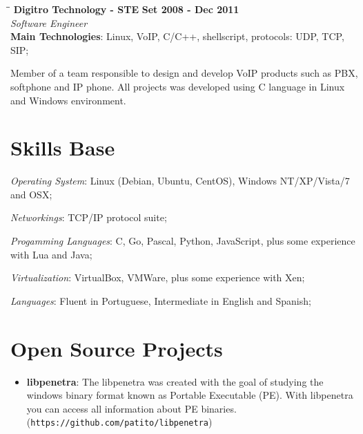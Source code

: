 \documentclass[margin]{res}
\begin{document}
\begin{resume}
   \begin{tabbing}
   \hspace{2.3in}\= \hspace{1.5in}\= \kill %
    \textbf{Digitro Technology - STE}    \>\>\textbf{Set 2008 - Dec 2011}\\
    \textit{Software Engineer}\\   
    \textbf{Main Technologies}: Linux, VoIP, C/C++, shellscript, protocols: UDP, TCP, SIP;
   \end{tabbing}\vspace{-20pt}      %
    \vspace{2mm}
    
    Member of a team responsible to design and develop VoIP products such as PBX, softphone and IP phone. 
    All projects was developed using C language in Linux and Windows environment.
    

\section{Skills Base}  \textit{Operating System}:  Linux (Debian, Ubuntu, CentOS), Windows NT/XP/Vista/7 and OSX;

			\textit{Networkings}: TCP/IP protocol suite;
  
			\textit{Progamming Languages}: C, Go, Pascal, Python, JavaScript, plus some experience with Lua and Java;
  
			\textit{Virtualization}: VirtualBox, VMWare, plus some experience with Xen;

			\textit{Languages}: Fluent in Portuguese, Intermediate in English and Spanish;
 
\section{Open Source Projects}
		\begin{itemize}
		    \vspace{2mm}
		    \item \textbf{libpenetra}: The libpenetra was created with the goal of studying the windows binary format 
		                               known as Portable Executable (PE). With libpenetra you can access all information
		                               about PE binaries. (\texttt{https://github.com/patito/libpenetra}) \vspace{1mm}
		                               

\end{itemize}
\end{resume}
\end{document}
